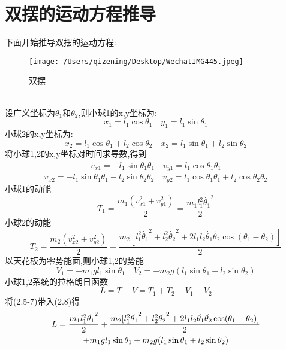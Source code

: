 \documentclass{report}
\begin{document}
\chapter{双摆的运动方程推导}
下面开始推导双摆的运动方程:\\
\begin{figure}[htbp]
    \centering 
    \texttt{[image: /Users/qizening/Desktop/WechatIMG445.jpeg]}
    \caption{双摆} 
    \label{图1} 
    \end{figure}\\
设广义坐标为$\theta_1$和$\theta_2$,则小球1的x,y坐标为:
\begin{equation}
    x_1 = l_1\cos{\theta_1} \quad
    y_1 = l_1\sin{\theta_1}
\end{equation}
小球2的x,y坐标为:
\begin{equation}
    x_2 = l_1\cos{\theta_1}+l_2\cos{\theta_2}\quad
    x_2 = l_1\sin{\theta_1}+l_2\sin{\theta_2}
\end{equation}
将小球1,2的x,y坐标对时间求导数,得到
\begin{equation}
    v_{x1}=-l_1\sin{\theta_1}\dot{\theta_1}\quad
    v_{y1}=l_1\cos{\theta_1}\dot{\theta_1}
\end{equation}
\begin{equation}
    v_{x2}=-l_1\sin{\theta_1}\dot{\theta_1}-l_2\sin{\theta_2}\dot{\theta_2}\quad
    v_{y2}=l_1\cos{\theta_1}\dot{\theta_1}+l_2\cos{\theta_2}\dot{\theta_2}
\end{equation}
小球1的动能
\begin{equation}
    T_1=\frac{m_1(v_{x1}^2+v_{y1}^2)}{2}=\frac{m_1l_1^2\dot{\theta_1}^2}{2}
\end{equation}
小球2的动能
\begin{equation}
    T_2=\frac{m_2(v_{x2}^2+v_{y2}^2)}{2}=\frac{m_2[l_1^2\dot{\theta_1}^2+l_2^2\dot{\theta_2}^2+2l_1l_2\dot{\theta_1}\dot{\theta_2}\cos(\theta_1-\theta_2)]}{2}
\end{equation}
以天花板为零势能面,则小球1,2的势能
\begin{equation}
    V_1=-m_1gl_1\sin{\theta_1}\quad
    V_2=-m_2g(l_1\sin{\theta_1}+l_2\sin{\theta_2})
\end{equation}
小球1,2系统的拉格朗日函数
\begin{equation}
    L=T-V=T_1+T_2-V_1-V_2
\end{equation}
将(2.5-7)带入(2.8)得
\begin{gather}
    L=\frac{m_1l_1^2\dot{\theta_1}^2}{2}  
+\frac{m_2[l_1^2\dot{\theta_1}^2+l_2^2\dot{\theta_2}^2  
+2l_1l_2\dot{\theta_1}\dot{\theta_2}\cos(\theta_1-\theta_2)]}{2}\notag \\
+m_1gl_1\sin{\theta_1}
+m_2g(l_1\sin{\theta_1}+l_2\sin{\theta_2})
\end{gather}
\end{document}
